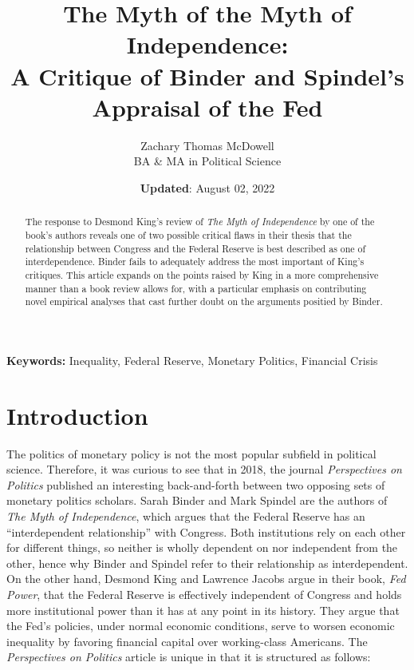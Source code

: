 \documentclass[
  11pt,
]{article}
\title{The Myth of the Myth of Independence:\\
A Critique of Binder and Spindel's Appraisal of the Fed}
\author{Zachary Thomas McDowell\\
BA \& MA in Political Science}
\date{\textbf{Updated}: August 02, 2022}
\providecommand{\keywords}[1]{\textbf{Keywords:} #1}
\begin{document}
\maketitle
\begin{abstract}
\singlespace The response to Desmond King's review of \emph{The Myth of
Independence} by one of the book's authors reveals one of two possible
critical flaws in their thesis that the relationship between Congress
and the Federal Reserve is best described as one of interdependence.
Binder fails to adequately address the most important of King's
critiques. This article expands on the points raised by King in a more
comprehensive manner than a book review allows for, with a particular
emphasis on contributing novel empirical analyses that cast further
doubt on the arguments positied by Binder.
\end{abstract}

\keywords{Inequality, Federal Reserve, Monetary Politics, Financial Crisis}

\let\thefootnote\relax\footnotetext{\lipsum[1][1-7]}

\thispagestyle{empty}

\newpage
{}

\thispagestyle{TOC}
\tableofcontents
\listoffigures
\listoftables
\clearpage
\newpage


\thispagestyle{INTRODUCTION}
\clearpage


\hypertarget{introduction}{%
\section*{Introduction}\label{introduction}}

The politics of monetary policy is not the most popular subfield in
political science. Therefore, it was curious to see that in 2018, the
journal \emph{Perspectives on Politics} published an interesting
back-and-forth between two opposing sets of monetary politics scholars.
Sarah Binder and Mark Spindel are the authors of \emph{The Myth of
Independence}, which argues that the Federal Reserve has an
``interdependent relationship'' with Congress. Both institutions rely on
each other for different things, so neither is wholly dependent on nor
independent from the other, hence why Binder and Spindel refer to their
relationship as interdependent. On the other hand, Desmond King and
Lawrence Jacobs argue in their book, \emph{Fed Power}, that the Federal
Reserve is effectively independent of Congress and holds more
institutional power than it has at any point in its history. They argue
that the Fed's policies, under normal economic conditions, serve to
worsen economic inequality by favoring financial capital over
working-class Americans. The \emph{Perspectives on Politics} article is
unique in that it is structured as follows:
\end{document}
